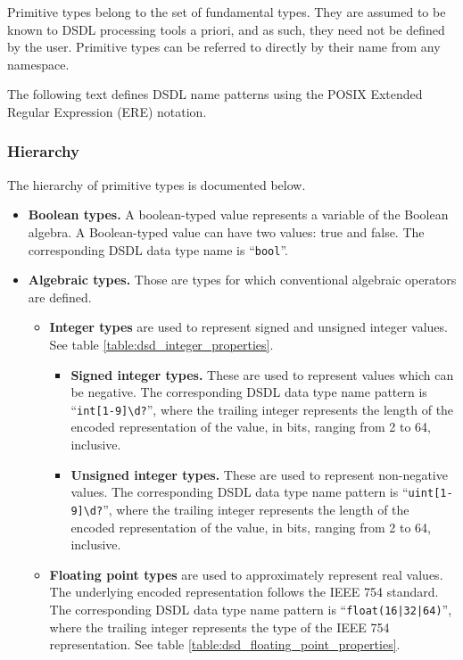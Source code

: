 Primitive types belong to the set of fundamental types.
They are assumed to be known to DSDL processing tools a priori,
and as such, they need not be defined by the user.
Primitive types can be referred to directly by their name from any namespace.

The following text defines DSDL name patterns using the POSIX Extended Regular Expression (ERE) notation.

\subsubsection{Hierarchy}

The hierarchy of primitive types is documented below.

\begin{itemize}
    \item \textbf{Boolean types.} A boolean-typed value represents a variable of the Boolean algebra.
    A Boolean-typed value can have two values: true and false.
    The corresponding DSDL data type name is ``\verb|bool|''.

    \item \textbf{Algebraic types.} Those are types for which conventional algebraic operators are defined.
    \begin{itemize}
        \item \textbf{Integer types} are used to represent signed and unsigned integer values.
        See table \ref{table:dsd_integer_properties}.
        \begin{itemize}
            \item \textbf{Signed integer types.} These are used to represent values which can be negative.
            The corresponding DSDL data type name pattern is ``\verb|int[1-9]\d?|'',
            where the trailing integer represents the length of the
            encoded representation of the value, in bits, ranging from 2 to 64, inclusive.

            \item \textbf{Unsigned integer types.} These are used to represent non-negative values.
            The corresponding DSDL data type name pattern is ``\verb|uint[1-9]\d?|'',
            where the trailing integer represents the length of the
            encoded representation of the value, in bits, ranging from 2 to 64, inclusive.
        \end{itemize}

        \item \textbf{Floating point types} are used to approximately represent real values.
        The underlying encoded representation follows the IEEE 754 standard.
        The corresponding DSDL data type name pattern is ``\verb~float(16|32|64)~'', where the trailing
        integer represents the type of the IEEE 754 representation.
        See table \ref{table:dsd_floating_point_properties}.
    \end{itemize}
\end{itemize}

